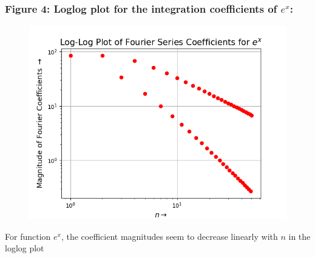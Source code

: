 \documentclass[12pt, a4paper]{article}
\begin{document}
\subsubsection{Figure 4: Loglog plot for the integration coefficients of $e^{x}$:}
\vspace*{-0.5cm}
\begin{figure}[H]
    \centering
    \includegraphics[scale = 0.75]{Figure_4.png}
    \label{fig:sample}
\end{figure}
\vspace*{-0.5cm}
\begin{center}
    For function $e^{x}$, the coefficient magnitudes seem to decrease linearly with $n$ in the loglog plot
\end{center}
\end{document}
